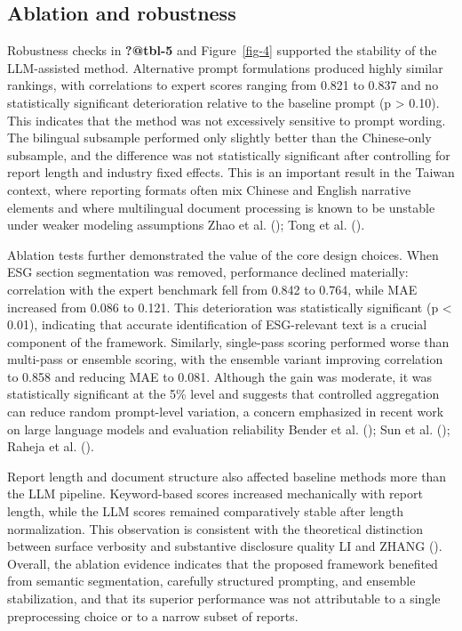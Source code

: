 \documentclass[
  12pt,
]{article}
\begin{document}
\subsection{Ablation and robustness}\label{ablation-and-robustness}

Robustness checks in \textbf{?@tbl-5} and Figure~\ref{fig-4} supported
the stability of the LLM-assisted method. Alternative prompt
formulations produced highly similar rankings, with correlations to
expert scores ranging from 0.821 to 0.837 and no statistically
significant deterioration relative to the baseline prompt (p
\textgreater{} 0.10). This indicates that the method was not excessively
sensitive to prompt wording. The bilingual subsample performed only
slightly better than the Chinese-only subsample, and the difference was
not statistically significant after controlling for report length and
industry fixed effects. This is an important result in the Taiwan
context, where reporting formats often mix Chinese and English narrative
elements and where multilingual document processing is known to be
unstable under weaker modeling assumptions Zhao et al.
(); Tong et al.
().

Ablation tests further demonstrated the value of the core design
choices. When ESG section segmentation was removed, performance declined
materially: correlation with the expert benchmark fell from 0.842 to
0.764, while MAE increased from 0.086 to 0.121. This deterioration was
statistically significant (p \textless{} 0.01), indicating that accurate
identification of ESG-relevant text is a crucial component of the
framework. Similarly, single-pass scoring performed worse than
multi-pass or ensemble scoring, with the ensemble variant improving
correlation to 0.858 and reducing MAE to 0.081. Although the gain was
moderate, it was statistically significant at the 5\% level and suggests
that controlled aggregation can reduce random prompt-level variation, a
concern emphasized in recent work on large language models and
evaluation reliability Bender et al. ();
Sun et al. (); Raheja et al.
().

Report length and document structure also affected baseline methods more
than the LLM pipeline. Keyword-based scores increased mechanically with
report length, while the LLM scores remained comparatively stable after
length normalization. This observation is consistent with the
theoretical distinction between surface verbosity and substantive
disclosure quality LI and ZHANG (). Overall,
the ablation evidence indicates that the proposed framework benefited
from semantic segmentation, carefully structured prompting, and ensemble
stabilization, and that its superior performance was not attributable to
a single preprocessing choice or to a narrow subset of reports.
\end{document}
